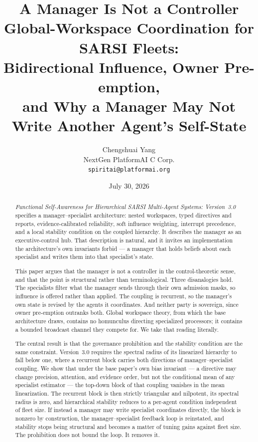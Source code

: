 \documentclass[11pt]{article}
\title{\LARGE A Manager Is Not a Controller\\[6pt]
\Large Global-Workspace Coordination for SARSI Fleets:\\
\Large Bidirectional Influence, Owner Pre-emption,\\
\Large and Why a Manager May Not Write Another Agent's Self-State}
\author{Chengshuai Yang\\
\small NextGen PlatformAI C Corp.\\
\small \texttt{spiritai@platformai.org}}
\date{July 30, 2026}
\begin{document}
\maketitle
\thispagestyle{empty}

\begin{abstract}
\noindent
\emph{Functional Self-Awareness for Hierarchical SARSI Multi-Agent Systems: Version~3.0}~\citep{yang2026hierarchical} specifies a manager--specialist architecture: nested workspaces, typed directives and reports, evidence-calibrated reliability, soft influence weighting, interrupt precedence, and a local stability condition on the coupled hierarchy. It describes the manager as an executive-control hub. That description is natural, and it invites an implementation the architecture's own invariants forbid --- a manager that holds beliefs about each specialist and writes them into that specialist's state.

This paper argues that the manager is not a controller in the control-theoretic sense, and that the point is structural rather than terminological. Three disanalogies hold. The specialists filter what the manager sends through their own admission masks, so influence is offered rather than applied. The coupling is recurrent, so the manager's own state is revised by the agents it coordinates. And neither party is sovereign, since owner pre-emption outranks both. Global workspace theory, from which the base architecture draws, contains no homunculus directing specialized processors; it contains a bounded broadcast channel they compete for. We take that reading literally.

The central result is that the governance prohibition and the stability condition are the same constraint. Version~3.0 requires the spectral radius of its linearized hierarchy to fall below one, where a recurrent block carries both directions of manager--specialist coupling. We show that under the base paper's own bias invariant --- a directive may change precision, attention, and evidence order, but not the conditional mean of any specialist estimator --- the top-down block of that coupling vanishes in the mean linearization. The recurrent block is then strictly triangular and nilpotent, its spectral radius is zero, and hierarchical stability reduces to a per-agent condition independent of fleet size. If instead a manager may write specialist coordinates directly, the block is nonzero by construction, the manager--specialist feedback loop is reinstated, and stability stops being structural and becomes a matter of tuning gains against fleet size. The prohibition does not bound the loop. It removes it.


\end{abstract}
\end{document}

